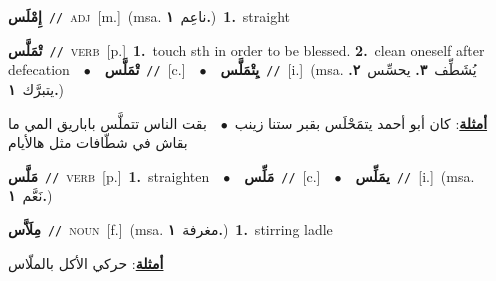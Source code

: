 \documentclass[10pt,a4paper,twoside]{article} %
\begin{document}
\begin{multicols}{2}
{\setlength\topsep{0pt}\textbf{\foreignlanguage{arabic}{إِمْلَس}}\ {\color{gray}\texttt{//}\color{black}}\ \textsc{adj}\ [m.]\ \color{gray}(msa. \foreignlanguage{arabic}{ناعِم}~\foreignlanguage{arabic}{\textbf{١.}})\color{black}\ \textbf{1.}~straight\ } \vspace{2mm}

{\setlength\topsep{0pt}\textbf{\foreignlanguage{arabic}{تْمَلَّس}}\ {\color{gray}\texttt{//}\color{black}}\ \textsc{verb}\ [p.]\ \textbf{1.}~touch sth in order to be blessed.  \textbf{2.}~clean oneself after defecation\ \ $\bullet$\ \ \setlength\topsep{0pt}\textbf{\foreignlanguage{arabic}{تْمَلَّس}}\ {\color{gray}\texttt{//}\color{black}}\ [c.]\ \ $\bullet$\ \ \setlength\topsep{0pt}\textbf{\foreignlanguage{arabic}{يِتْمَلَّس}}\ {\color{gray}\texttt{//}\color{black}}\ [i.]\ \color{gray}(msa. \foreignlanguage{arabic}{يُشَطِّف}~\foreignlanguage{arabic}{\textbf{٣.}}  \foreignlanguage{arabic}{يحسِّس}~\foreignlanguage{arabic}{\textbf{٢.}}  \foreignlanguage{arabic}{يتبرَّك}~\foreignlanguage{arabic}{\textbf{١.}})\color{black}\  \begin{flushright}\color{gray}\foreignlanguage{arabic}{\textbf{\underline{\foreignlanguage{arabic}{أمثلة}}}: كان أبو أحمد يتمَحْلَس بقبر ستنا زينب\ $\bullet$\ \  بقت الناس تتملَّس باباريق المي ما بقاش في شطّافات مثل هالأيام}\end{flushright}\color{black}} \vspace{2mm}

{\setlength\topsep{0pt}\textbf{\foreignlanguage{arabic}{مَلَّس}}\ {\color{gray}\texttt{//}\color{black}}\ \textsc{verb}\ [p.]\ \textbf{1.}~straighten\ \ $\bullet$\ \ \setlength\topsep{0pt}\textbf{\foreignlanguage{arabic}{مَلِّس}}\ {\color{gray}\texttt{//}\color{black}}\ [c.]\ \ $\bullet$\ \ \setlength\topsep{0pt}\textbf{\foreignlanguage{arabic}{يمَلِّس}}\ {\color{gray}\texttt{//}\color{black}}\ [i.]\ \color{gray}(msa. \foreignlanguage{arabic}{نَعَّم}~\foreignlanguage{arabic}{\textbf{١.}})\color{black}\ } \vspace{2mm}

{\setlength\topsep{0pt}\textbf{\foreignlanguage{arabic}{مِلَاَّس}}\ {\color{gray}\texttt{//}\color{black}}\ \textsc{noun}\ [f.]\ \color{gray}(msa. \foreignlanguage{arabic}{مغرفة}~\foreignlanguage{arabic}{\textbf{١.}})\color{black}\ \textbf{1.}~stirring ladle\  \begin{flushright}\color{gray}\foreignlanguage{arabic}{\textbf{\underline{\foreignlanguage{arabic}{أمثلة}}}: حركي الأكل بالملّاس}\end{flushright}\color{black}} \vspace{2mm}


\end{multicols}
\end{document}
